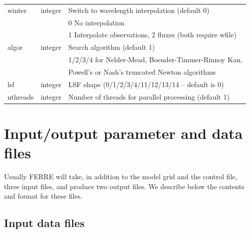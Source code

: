 \documentclass[12pt]{article}
\begin{document}
\begin{table}
\begin{tabular}{lcl}
winter  &   integer            & Switch to wavelength interpolation (default 0) \\
        &                      & 0 No interpolation \\
        &                      & 1 Interpolate observations, 2 fluxes (both require wfile) \\
 algor  &  integer             & Search algorithm (default 1) \\
         &                      & 1/2/3/4 for Nelder-Mead, Boender-Timmer-Rinnoy Kan, \\
         &                      &   Powell's or Nash's truncated Newton algorithms \\
 lsf     &  integer             & LSF shape (0/1/2/3/4/11/12/13/14 -- default is 0) \\
 nthreads &  integer            & Number of threads for parallel processing (default 1) \\
\hline
\end{tabular} 
\end{table}

\section{Input/output parameter and data files}
\label{inout}

Usually FERRE will take, in addition to the model grid and the control file, 
three input files, and produce two output files. We describe below the 
contents and format for these files. 

\subsection{Input data files}
\label{input}
\end{document}

